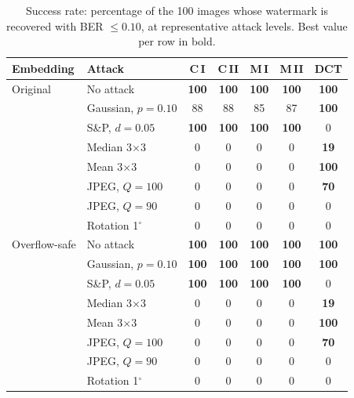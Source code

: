 \begin{table}[t]
\centering
\caption{Success rate: percentage of the 100 images whose watermark is recovered with BER $\leq 0.10$, at representative attack levels. Best value per row in bold.}
\label{tab:ablation_success}
\small
\setlength{\tabcolsep}{4pt}
\begin{tabular}{llccccc}
\toprule
Embedding & Attack & C\,I & C\,II & M\,I & M\,II & DCT \\
\midrule
Original & No attack & \textbf{100} & \textbf{100} & \textbf{100} & \textbf{100} & \textbf{100} \\
 & Gaussian, $p=0.10$ & 88 & 88 & 85 & 87 & \textbf{100} \\
 & S\&P, $d=0.05$ & \textbf{100} & \textbf{100} & \textbf{100} & \textbf{100} & 0 \\
 & Median 3$\times$3 & 0 & 0 & 0 & 0 & \textbf{19} \\
 & Mean 3$\times$3 & 0 & 0 & 0 & 0 & \textbf{100} \\
 & JPEG, $Q=100$ & 0 & 0 & 0 & 0 & \textbf{70} \\
 & JPEG, $Q=90$ & 0 & 0 & 0 & 0 & 0 \\
 & Rotation 1$^\circ$ & 0 & 0 & 0 & 0 & 0 \\
\midrule
Overflow-safe & No attack & \textbf{100} & \textbf{100} & \textbf{100} & \textbf{100} & \textbf{100} \\
 & Gaussian, $p=0.10$ & \textbf{100} & \textbf{100} & \textbf{100} & \textbf{100} & \textbf{100} \\
 & S\&P, $d=0.05$ & \textbf{100} & \textbf{100} & \textbf{100} & \textbf{100} & 0 \\
 & Median 3$\times$3 & 0 & 0 & 0 & 0 & \textbf{19} \\
 & Mean 3$\times$3 & 0 & 0 & 0 & 0 & \textbf{100} \\
 & JPEG, $Q=100$ & 0 & 0 & 0 & 0 & \textbf{70} \\
 & JPEG, $Q=90$ & 0 & 0 & 0 & 0 & 0 \\
 & Rotation 1$^\circ$ & 0 & 0 & 0 & 0 & 0 \\
\bottomrule
\end{tabular}
\end{table}
